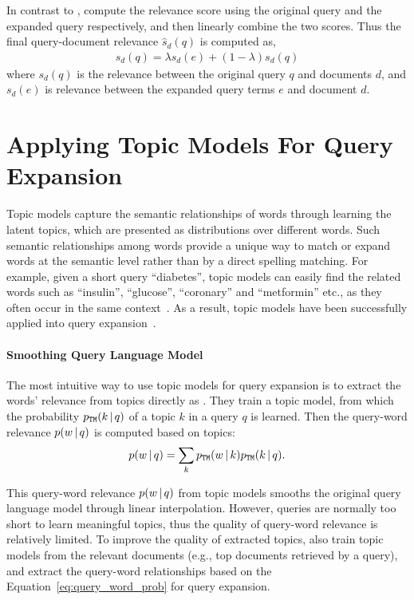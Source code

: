 In contrast to \citet{zhai-01b}, \citet{Lavrenko-2001} compute
the relevance score using the original query and the expanded query
respectively, and then linearly combine the two scores. Thus the final
query-document relevance $\hat{s}_d(q)$ is computed as,
\begin{align}
\label{eq:rm_qe_comb}
\hat{s}_d(q) = \lambda s_d(e) + (1-\lambda)s_d(q)
\end{align}
where $s_d(q)$ is the relevance between the original query $q$ and
documents $d$, and $s_d(e)$ is relevance between the expanded query
terms $e$ and document $d$.

\section{Applying Topic Models For Query Expansion}

Topic models capture the semantic relationships of words through
learning the latent topics, which are presented as distributions over
different words. Such semantic relationships among words provide a
unique way to match or expand words at the semantic level rather than
by a direct spelling matching. For example, given a short query ``diabetes'',
topic models can easily find the related words such as
``insulin'', ``glucose'', ``coronary'' and ``metformin'' etc., 
as they often occur in the same context~\citep{Zeng-2012}. 
As a result, topic models have been
successfully applied into query expansion~\citep{Yi-2009,Park-2009,Zeng-2012}.

\paragraph{Smoothing Query Language Model}


The most intuitive way to use topic models for query expansion is to
extract the words' relevance from topics directly as
\citet{Yi-2009}. They train a topic model, from which the probability
$p_{\texttt{TM}}(k \, | \, q)$ of a topic $k$ in a query $q$ is learned. Then
the query-word relevance $p(w \, | \, q)$ is computed based on topics:
\begin{align}
\label{eq:query_word_prob}
p(w \, | \, q) = \sum_k p_{\texttt{TM}}(w \, | \, k) p_{\texttt{TM}}(k \, | \, q).
\end{align}

This query-word relevance $p(w \, | \, q)$ from topic models 
smooths the original query language model through linear
interpolation. However, queries are normally too short to learn
meaningful topics, thus the quality of query-word relevance is
relatively limited. To improve the quality of extracted topics,
\citet{Yi-2009} also train topic models from the relevant documents
(e.g., top documents retrieved by a query), and extract the query-word
relationships based on the Equation~\ref{eq:query_word_prob} for query
expansion.

